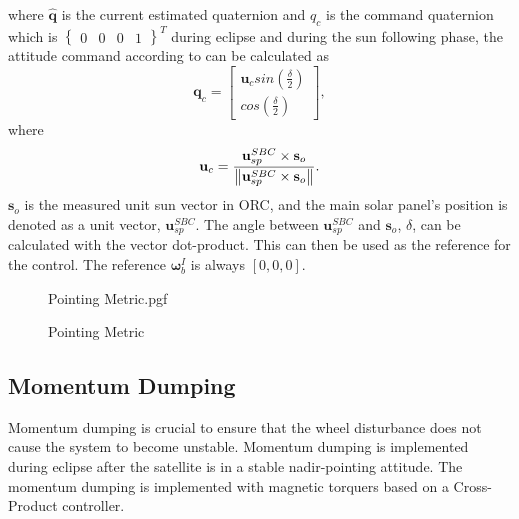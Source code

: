 where $\hat{\mathbf{q}}$ is the current estimated quaternion and $q_{c}$ is the command quaternion which is $\begin{Bmatrix}
	0 & 0 & 0& 1
\end{Bmatrix}^T$ during eclipse and during the sun following phase, the attitude command according to \cite{chen2000ground} can be calculated as 
\begin{equation}
	\mathbf{q}_c = \begin{bmatrix}
		\mathbf{u}_c sin(\frac{\delta}{2}) \\
		cos(\frac{\delta}{2})
	\end{bmatrix},
\end{equation}
where 
\begin{equation}
	\mathbf{u}_c = \frac{\mathbf{u}_{sp}^{SBC} \times \mathbf{s}_o}{\left\lVert\mathbf{u}_{sp}^{SBC} \times \mathbf{s}_o\right\rVert}.
\end{equation}
$\mathbf{s}_o$ is the measured unit sun vector in ORC, and the main solar panel's position is denoted as a unit vector, $\mathbf{u}_{sp}^{SBC}$. The angle between $\mathbf{u}_{sp}^{SBC}$ and $\mathbf{s}_o$, $\delta$, can be calculated with the vector dot-product. This can then be used as the reference for the control. The reference $\boldsymbol{\omega}_b^I$ is always $[0, 0, 0]$. 

\begin{figure}[!htb]
	\centering
	\def\pgfwidth{10cm}
	{Pointing Metric.pgf}
	
	\caption{Pointing Metric}
	\label{fig:Pointing Metric}
\end{figure}

\subsection{Momentum Dumping}
Momentum dumping is crucial to ensure that the wheel disturbance does not cause the system to become unstable. Momentum dumping is implemented during eclipse after the satellite is in a stable nadir-pointing attitude. The momentum dumping is implemented with magnetic torquers based on a Cross-Product controller. 

